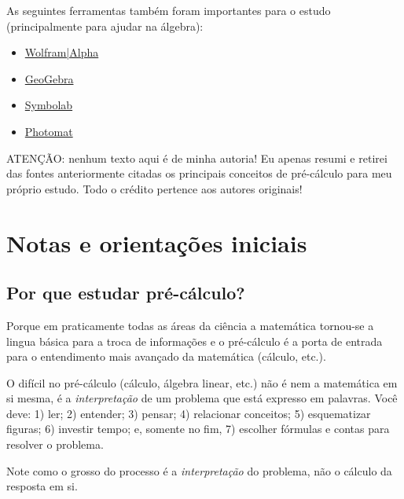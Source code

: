 \documentclass[pdftex, brazil, 12pt, twoside]{article}
\begin{document}
As seguintes ferramentas também foram importantes para o estudo (principalmente para
ajudar na álgebra):
\begin{itemize}[noitemsep]
\item \href{http://www.wolframalpha.com/}{Wolfram|Alpha}
\item \href{https://www.geogebra.org/}{GeoGebra}
\item \href{https://www.symbolab.com/}{Symbolab}
\item \href{https://photomath.net/}{Photomat}
\end{itemize}

ATENÇÃO: nenhum texto aqui é de minha autoria! Eu apenas resumi e retirei das fontes anteriormente
citadas os principais conceitos de pré-cálculo para meu próprio estudo. Todo o crédito pertence
aos autores originais!


\section{Notas e orientações iniciais}
\label{notas}

\subsection{Por que estudar pré-cálculo?}
\label{notas-por-que}

Porque em praticamente todas as áreas da ciência a matemática
tornou-se a lingua básica para a troca de informações e o pré-cálculo é a porta de entrada
para o entendimento mais avançado da matemática (cálculo, etc.).

O difícil no pré-cálculo (cálculo, álgebra linear, etc.) não é nem a matemática em
si mesma, é a \emph{interpretação} de um problema que está expresso em palavras. Você
deve: 1) ler; 2) entender; 3) pensar; 4) relacionar conceitos; 5) esquematizar figuras;
6) investir tempo; e, somente no fim, 7) escolher fórmulas e contas para resolver o
problema.

Note como o grosso do processo é a \emph{interpretação} do problema, não o cálculo
da resposta em si.
\end{document}
